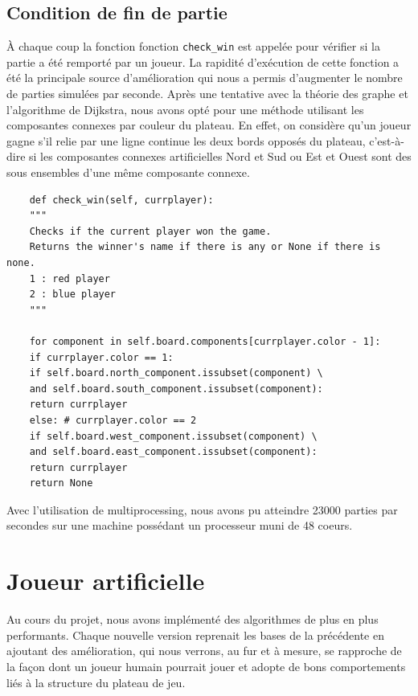 \documentclass[a4paper]{article}
\theoremstyle{definition}
\begin{document}
\subsection{Condition de fin de partie}

À chaque coup la fonction fonction \texttt{check\_win} est appelée pour vérifier si la partie a été remporté par un joueur. La rapidité d'exécution de cette fonction a été la principale source d'amélioration qui nous a permis d'augmenter le nombre de parties simulées par seconde. Après une tentative avec la théorie des graphe et l'algorithme de Dijkstra, nous avons opté pour une méthode utilisant les composantes connexes par couleur du plateau. En effet, on considère qu'un joueur gagne s'il relie par une ligne continue les deux bords opposés du plateau, c'est-à-dire si les composantes connexes artificielles Nord et Sud ou Est et Ouest sont des sous ensembles d'une même composante connexe.

\begin{lstlisting}
	def check_win(self, currplayer):
	"""
	Checks if the current player won the game. 
	Returns the winner's name if there is any or None if there is none.
	1 : red player
	2 : blue player
	"""
	
	for component in self.board.components[currplayer.color - 1]:
	if currplayer.color == 1:
	if self.board.north_component.issubset(component) \
	and self.board.south_component.issubset(component):
	return currplayer
	else: # currplayer.color == 2
	if self.board.west_component.issubset(component) \
	and self.board.east_component.issubset(component):
	return currplayer
	return None
\end{lstlisting}

Avec l'utilisation de multiprocessing, nous avons pu atteindre 23000 parties par secondes sur une machine possédant un processeur muni de 48 coeurs.

\newpage


\section{Joueur artificielle}

Au cours du projet, nous avons implémenté des algorithmes de plus en plus performants. Chaque nouvelle version reprenait les bases de la précédente en ajoutant des amélioration, qui nous verrons, au fur et à mesure, se rapproche de la façon dont un joueur humain pourrait jouer et adopte de bons comportements liés à la structure du plateau de jeu.
\end{document}
